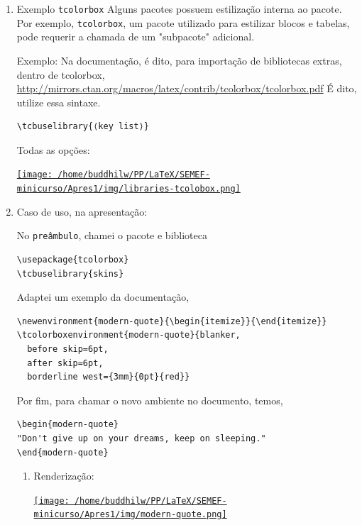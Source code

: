 \documentclass[11pt]{article}
\begin{document}
\begin{enumerate}
\item Exemplo \texttt{tcolorbox}
\label{sec:org5251a90}
Alguns pacotes possuem estilização interna ao pacote. Por exemplo,
\texttt{tcolorbox}, um pacote utilizado para estilizar blocos e tabelas, pode
requerir a chamada de um "subpacote" adicional.

Exemplo:
Na documentação, é dito, para importação de bibliotecas extras, dentro
de tcolorbox,
\url{http://mirrors.ctan.org/macros/latex/contrib/tcolorbox/tcolorbox.pdf}
É dito, utilize essa sintaxe.

\begin{verbatim}
\tcbuselibrary{⟨key list⟩}
\end{verbatim}

Todas as opções:

\href{img/libraries-tcolobox.png}{\texttt{[image: /home/buddhilw/PP/LaTeX/SEMEF-minicurso/Apres1/img/libraries-tcolobox.png]}}

\item Caso de uso, na apresentação:
\label{sec:orgde3448e}

No \texttt{preâmbulo}, chamei o pacote e biblioteca
\begin{verbatim}
\usepackage{tcolorbox}
\tcbuselibrary{skins}
\end{verbatim}

Adaptei um exemplo da documentação,
\begin{verbatim}
\newenvironment{modern-quote}{\begin{itemize}}{\end{itemize}}
\tcolorboxenvironment{modern-quote}{blanker,
  before skip=6pt,
  after skip=6pt,
  borderline west={3mm}{0pt}{red}}
\end{verbatim}

Por fim, para chamar o novo ambiente no documento, temos,
\begin{verbatim}
\begin{modern-quote}
"Don't give up on your dreams, keep on sleeping."
\end{modern-quote}
\end{verbatim}

\begin{enumerate}
\item Renderização:
\label{sec:org505dcc1}

\href{img/modern-quote.png}{\texttt{[image: /home/buddhilw/PP/LaTeX/SEMEF-minicurso/Apres1/img/modern-quote.png]}}
\end{enumerate}
\end{enumerate}
\end{document}
